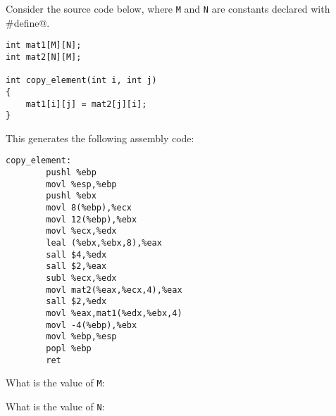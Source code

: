 \begin{problem}{8}

Consider the source code below, where {\tt M} and {\tt N} are
constants declared with \verb@#define@.

\begin{verbatim}
int mat1[M][N];
int mat2[N][M];

int copy_element(int i, int j)
{
    mat1[i][j] = mat2[j][i];
}
\end{verbatim}

This generates the following assembly code:

\begin{verbatim}
copy_element:
        pushl %ebp
        movl %esp,%ebp
        pushl %ebx
        movl 8(%ebp),%ecx
        movl 12(%ebp),%ebx
        movl %ecx,%edx
        leal (%ebx,%ebx,8),%eax
        sall $4,%edx
        sall $2,%eax
        subl %ecx,%edx
        movl mat2(%eax,%ecx,4),%eax
        sall $2,%edx
        movl %eax,mat1(%edx,%ebx,4)
        movl -4(%ebp),%ebx
        movl %ebp,%esp
        popl %ebp
        ret
\end{verbatim}

\begin{choice}
\item What is the value of {\tt M}:

\vspace{.4 in}

\item What is the value of {\tt N}:

\vspace{.4 in}

\end{choice}
\end{problem}
